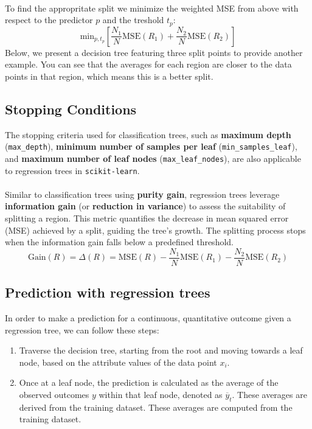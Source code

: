 \documentclass[10pt,a4paper]{report}
\begin{document}
\paragraph{}To find the appropritate split we minimize the weighted MSE from above with respect to the predictor $p$ and the treshold $t_p$:
$$\textrm{min}_{p,t_p}\left[\frac{N_1}{N}\textrm{MSE}(R_1)+\frac{N_2}{N}\textrm{MSE}(R_2)\right]$$
Below, we present a decision tree featuring three split points to provide another example. You can see that the averages for each region are closer to the data points in that region, which means this is a better split.\\
\subsection{Stopping Conditions}
The stopping criteria used for classification trees, such as \textbf{maximum depth} (\texttt{max\_depth}), \textbf{minimum number of samples per leaf} (\texttt{min\_samples\_leaf}), and \textbf{maximum number of leaf nodes} (\texttt{max\_leaf\_nodes}), are also applicable to regression trees in \texttt{scikit-learn}.
\paragraph{}Similar to classification trees using \textbf{purity gain}, regression trees leverage \textbf{information gain} (or \textbf{reduction in variance}) to assess the suitability of splitting a region. This metric quantifies the decrease in mean squared error (MSE) achieved by a split, guiding the tree's growth. The splitting process stops when the information gain falls below a predefined threshold.
$$\textrm{Gain}(R) = \Delta(R) = \textrm{MSE}(R)-\frac{N_1}{N}\textrm{MSE}(R_1)-\frac{N_2}{N}\textrm{MSE}(R_2)$$
\subsection{Prediction with regression trees}
In order to make a prediction for a continuous, quantitative outcome given a regression tree, we can follow these steps:
\begin{enumerate}
\item Traverse the decision tree, starting from the root and moving towards a leaf node, based on the attribute values of the data point $x_i$.
\item Once at a leaf node, the prediction is calculated as the average of the observed outcomes $y$ within that leaf node, denoted as $\overline{y}_t$. These averages are derived from the training dataset. These averages are computed from the training dataset.
\end{enumerate}
\end{document}
